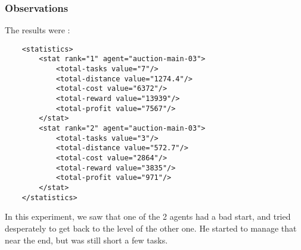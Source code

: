 \documentclass[11pt]{article}
\begin{document}
\subsubsection{Observations}
The results were :

\begin{lstlisting}
	<statistics>
		<stat rank="1" agent="auction-main-03">
			<total-tasks value="7"/>
			<total-distance value="1274.4"/>
			<total-cost value="6372"/>
			<total-reward value="13939"/>
			<total-profit value="7567"/>
		</stat>
		<stat rank="2" agent="auction-main-03">
			<total-tasks value="3"/>
			<total-distance value="572.7"/>
			<total-cost value="2864"/>
			<total-reward value="3835"/>
			<total-profit value="971"/>
		</stat>
	</statistics>
\end{lstlisting}

In this experiment, we saw that one of the 2 agents had a bad start, and tried desperately to get back to the level of the other one. He started to manage that near the end, but was still short a few tasks.
\end{document}
